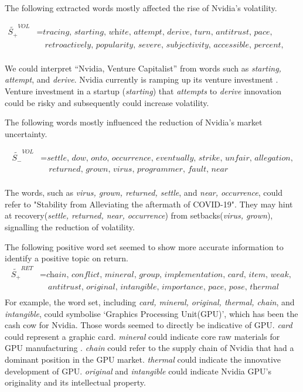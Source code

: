 \documentclass[logo,bsc,singlespacing,parskip]{infthesis}
\begin{document}
The following extracted words mostly affected the rise of Nvidia’s volatility. 

\begin{align*}
\tilde{S_{+}}^{VOL} &= \textit{tracing, starting, white, attempt, derive, turn, antitrust, pace, } \\
               &\quad \textit{retroactively, popularity, severe, subjectivity, accessible, percent, travel} \\
\end{align*}

We could interpret “Nvidia, Venture Capitalist” from words such as \textit{starting, attempt}, and \textit{derive}. Nvidia currently is ramping up its venture investment \cite{nvidia2024venturecapital, nvidia2024bloginvestments, pymnts2023nvidiainvests}. Venture investment in a startup (\textit{starting}) that \textit{attempts} to \textit{derive} innovation could be risky and subsequently could increase volatility. 

The following words mostly influenced the reduction of Nvidia's market uncertainty. 

\begin{align*}
\tilde{S_{-}}^{VOL} &= \textit{settle, dow, onto, occurrence, eventually, strike, unfair, allegation,} \\
               &\quad \textit{returned, grown, virus, programmer, fault, near} \\
\end{align*}

The words, such as \textit{virus, grown, returned, settle}, and \textit{near, occurrence}, could refer to "Stability from Alleviating the aftermath of COVID-19". They may hint at recovery(\textit{settle, returned, near, occurrence}) from setbacks(\textit{virus, grown}), signalling the reduction of volatility.


The following positive word set seemed to show more accurate information to identify a positive topic on return.
\begin{align*}
\tilde{S_{+}}^{RET} &= \textit{chain, conflict, mineral, group, implementation, card, item, weak, } \\
               &\quad \textit{antitrust, original, intangible, importance, pace, pose, thermal} \\
\end{align*} 
For example, the word set, including \textit{card, mineral, original, thermal, chain}, and \textit{intangible}, could symbolise ‘Graphics Processing Unit(GPU)’, which has been the cash cow for Nvidia. Those words seemed to directly be indicative of GPU. \textit{card} could represent a graphic card. \textit{mineral } could indicate core raw materials for GPU manufacturing \cite{euromines_2020}. \textit{chain} could refer to the supply chain of Nvidia that had a dominant position in the GPU market. \textit{thermal} could indicate the innovative development of GPU. \textit{original} and \textit{intangible} could indicate Nvidia GPU’s originality and its intellectual property.  
\end{document}
